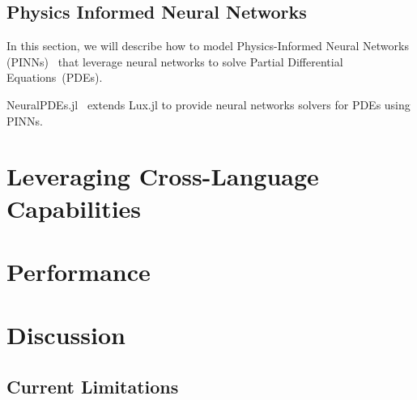 \subsection{Physics Informed Neural Networks}
\label{subsec:physics_informed_neural_networks_lux}


In this section, we will describe how to model Physics-Informed Neural Networks (PINNs)~\citep{raissi2019physics} that leverage neural networks to solve Partial Differential Equations~(PDEs). 


NeuralPDEs.jl~\citep{zubov2021neuralpde} extends Lux.jl to provide neural networks solvers for PDEs using PINNs.


\section{Leveraging Cross-Language Capabilities}
\label{sec:cross_language_capabilities}


\section{Performance}
\label{sec:performance_lux}


\section{Discussion}
\label{sec:discussion_lux}

\subsection{Current Limitations}
\label{subsec:current_limitations}
